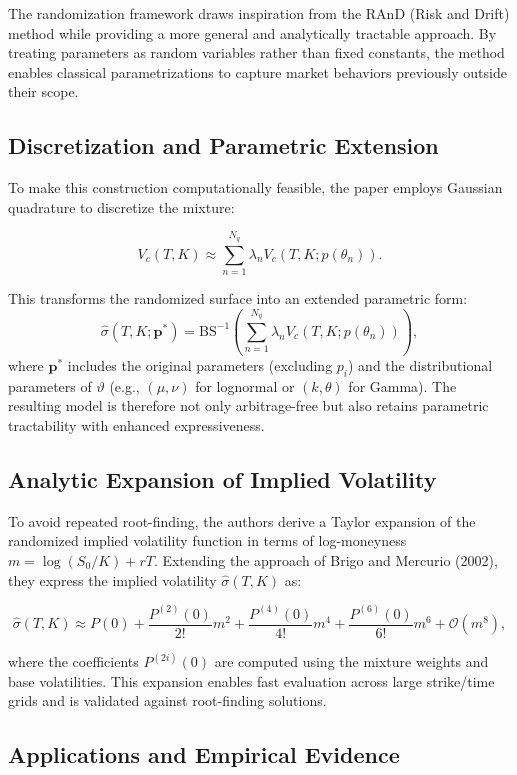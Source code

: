 The randomization framework draws inspiration from the RAnD (Risk and Drift) method while providing a more general and analytically tractable approach. By treating parameters as random variables rather than fixed constants, the method enables classical parametrizations to capture market behaviors previously outside their scope.

\subsection{Discretization and Parametric Extension}

To make this construction computationally feasible, the paper employs Gaussian quadrature to discretize the mixture:

\[
    V_c(T,K) \approx \sum_{n=1}^{N_q} \lambda_n V_c(T,K; p(\theta_n)).
\]

This transforms the randomized surface into an extended parametric form:
\[
    \hat{\sigma}(T,K; \mathbf{p}^*) = \text{BS}^{-1}\left(\sum_{n=1}^{N_q} \lambda_n V_c(T,K; p(\theta_n))\right),
\]
where $\mathbf{p}^*$ includes the original parameters (excluding $p_i$) and the distributional parameters of $\vartheta$ (e.g., $(\mu, \nu)$ for lognormal or $(k, \theta)$ for Gamma). The resulting model is therefore not only arbitrage-free but also retains parametric tractability with enhanced expressiveness.

\subsection{Analytic Expansion of Implied Volatility}

To avoid repeated root-finding, the authors derive a Taylor expansion of the randomized implied volatility function in terms of log-moneyness $m = \log(S_0/K) + rT$. Extending the approach of Brigo and Mercurio (2002), they express the implied volatility $\hat{\sigma}(T,K)$ as:

\[
    \hat{\sigma}(T,K) \approx P(0) + \frac{P^{(2)}(0)}{2!}m^2 + \frac{P^{(4)}(0)}{4!}m^4 + \frac{P^{(6)}(0)}{6!}m^6 + \mathcal{O}(m^8),
\]

where the coefficients $P^{(2i)}(0)$ are computed using the mixture weights and base volatilities. This expansion enables fast evaluation across large strike/time grids and is validated against root-finding solutions.

\subsection{Applications and Empirical Evidence}

